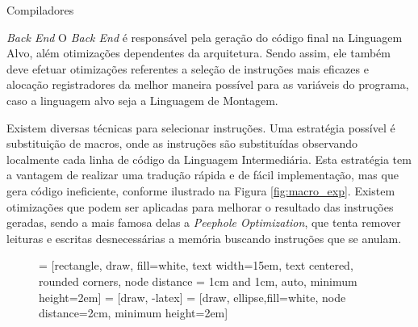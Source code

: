 \begin{section}{Compiladores}
\begin{subsection}{\textit{Back End}}
    O \textit{Back End} é responsável pela geração do código final na
Linguagem Alvo, além otimizações dependentes da arquitetura. Sendo assim,
ele também deve efetuar otimizações referentes
a seleção de instruções mais eficazes e alocação registradores
da melhor maneira possível para as variáveis do programa, caso a linguagem alvo
seja a Linguagem de Montagem.

    Existem diversas técnicas para selecionar instruções. Uma estratégia possível
é substituição de macros, onde as instruções são substituídas
observando localmente cada linha de código da Linguagem Intermediária. Esta estratégia
tem a vantagem de realizar uma tradução rápida e de fácil implementação, mas que gera
código ineficiente, conforme ilustrado na Figura \ref{fig:macro_exp}. Existem otimizações
que podem ser aplicadas para melhorar o resultado das instruções geradas, sendo a mais famosa
delas a \textit{Peephole Optimization}, que tenta remover leituras e escritas desnecessárias
a memória buscando instruções que se anulam.

\begin{figure}
 = [rectangle, draw, fill=white,
    text width=15em, text centered, rounded corners, node distance = 1cm and 1cm, auto, minimum height=2em]
 = [draw, -latex]
 = [draw, ellipse,fill=white, node distance=2cm,
    minimum height=2em]

\begin{center}
\end{center}
\end{figure}
\end{subsection}
\end{section}
